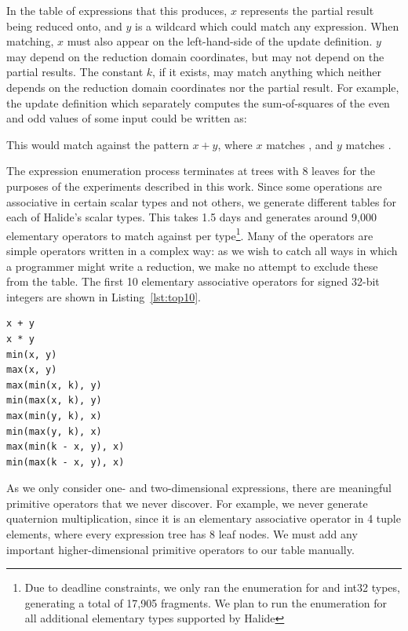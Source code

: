 In the table of expressions that this produces, $x$ represents the partial result being reduced onto, and $y$ is a wildcard which could match any expression. When matching, $x$ must also appear on the left-hand-side of the update definition. $y$ may depend on the reduction domain coordinates, but may not depend on the partial results. The constant $k$, if it exists, may match anything which neither depends on the reduction domain coordinates nor the partial result. For example, the update definition which separately computes the sum-of-squares of the even and odd values of some input  could be written as:


This would match against the pattern $x + y$, where $x$ matches , and $y$ matches .

The expression enumeration process terminates at trees with 8 leaves for the purposes of the experiments described in this work. Since some operations are associative in certain scalar types and not others, we generate different tables for each of Halide's scalar types.  This takes 1.5 days and generates around 9,000 elementary operators to match against per type\footnote{Due to deadline constraints, we only ran the enumeration for  and {int32} types, generating a total of 17,905 fragments.  We plan to run the enumeration for all additional elementary types supported by Halide}. Many of the operators are simple operators written in a complex way: as we wish to catch all ways in which a programmer might write a reduction, we make no attempt to exclude these from the table. The first 10 elementary associative operators for signed 32-bit integers are shown in Listing~\ref{lst:top10}.

\begin{lstlisting}[caption={The first 10 elementary associative operators for 32-bit signed integers}, label={lst:top10}]
x + y
x * y
min(x, y)
max(x, y)
max(min(x, k), y)
min(max(x, k), y)
max(min(y, k), x)
min(max(y, k), x)
max(min(k - x, y), x)
min(max(k - x, y), x)
\end{lstlisting}


As we only consider one- and two-dimensional expressions, there are meaningful primitive operators that we never discover. For example, we never generate quaternion multiplication, since it is an elementary associative operator in 4 tuple elements, where every expression tree has 8 leaf nodes. We must add any important higher-dimensional primitive operators to our table manually.

